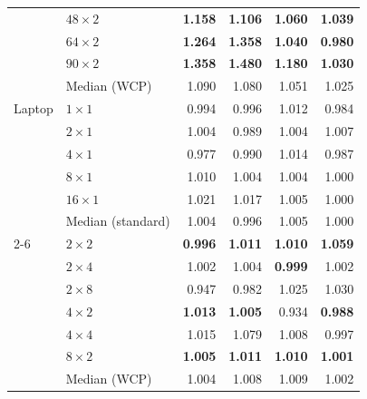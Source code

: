 \begin{table}[H]
\begin{tabular}{llrrrr}
 & $48 \times 2$ & \textbf{1.158} & \textbf{1.106} & \textbf{1.060} & \textbf{1.039} \\
 & $64 \times 2$ & \textbf{1.264} & \textbf{1.358} & \textbf{1.040} & \textbf{0.980} \\
 & $90 \times 2$ & \textbf{1.358} & \textbf{1.480} & \textbf{1.180} & \textbf{1.030} \\
 & Median (WCP) & 1.090 & 1.080 & 1.051 & 1.025 \\
\midrule
Laptop & $1 \times 1$ & 0.994 & 0.996 & 1.012 & 0.984 \\
 & $2 \times 1$ & 1.004 & 0.989 & 1.004 & 1.007 \\
 & $4 \times 1$ & 0.977 & 0.990 & 1.014 & 0.987 \\
 & $8 \times 1$ & 1.010 & 1.004 & 1.004 & 1.000 \\
 & $16 \times 1$ & 1.021 & 1.017 & 1.005 & 1.000 \\
 & Median (standard) & 1.004 & 0.996 & 1.005 & 1.000 \\
\cmidrule(lr){2-6}
 & $2 \times 2$ & \textbf{0.996} & \textbf{1.011} & \textbf{1.010} & \textbf{1.059} \\
 & $2 \times 4$ & 1.002 & 1.004 & \textbf{0.999} & 1.002 \\
 & $2 \times 8$ & 0.947 & 0.982 & 1.025 & 1.030 \\
 & $4 \times 2$ & \textbf{1.013} & \textbf{1.005} & 0.934 & \textbf{0.988} \\
 & $4 \times 4$ & 1.015 & 1.079 & 1.008 & 0.997 \\
 & $8 \times 2$ & \textbf{1.005} & \textbf{1.011} & \textbf{1.010} & \textbf{1.001} \\
 & Median (WCP) & 1.004 & 1.008 & 1.009 & 1.002 \\
\bottomrule
\end{tabular}
\end{table}
